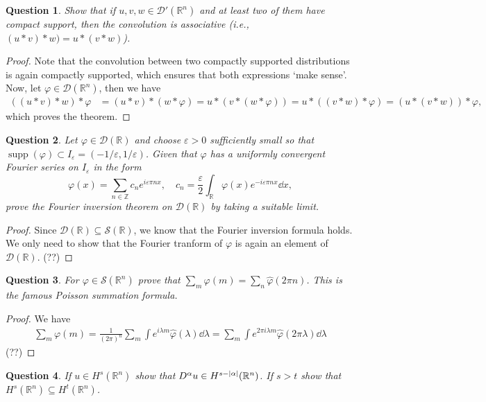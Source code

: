 \documentclass{article}
\theoremstyle{plain}
\newtheorem{question}{Question}
\theoremstyle{remark}
\renewcommand{\epsilon}{\varepsilon}
\renewcommand{\phi}{\varphi}
\newcommand{\Bb}{\mathbb}
\newcommand{\Cal}{\mathcal}
\newcommand\ZZ{\Bb Z}
\newcommand{\RR}{\Bb R}
\newcommand{\DD}{\Cal D}
\renewcommand\SS{\Cal S}
\newcommand\eps\epsilon
\DeclareMathOperator{\supp}{supp}
\begin{document}
\begin{question}
	Show that if $u, v, w \in \DD'(\RR^n)$ and at least two of them have compact support, then the convolution is associative (i.e., $(u * v) * w) = u* (v * w)$). 
\end{question}

\begin{proof}
	Note that the convolution between two compactly supported distributions is again compactly supported, which ensures that both expressions `make sense'. Now, let $\phi \in \DD(\RR^n)$, then we have
	\begin{align*}
		((u * v) * w) * \phi &= (u* v) * (w * \phi) = u * (v * ( w* \phi)) = u * ((v * w) * \phi) = (u * (v * w)) * \phi,
	\end{align*}
	which proves the theorem. 
\end{proof}

\begin{question}
	Let $\phi \in \DD(\RR)$ and choose $\eps > 0$ sufficiently small so that $\supp(\phi) \subset I_\eps = (-1/\eps, 1/\eps)$. Given that $\phi$ has a uniformly convergent Fourier series on $I_\eps$ in the form
	\[
	\phi(x) = \sum_{n \in \ZZ} c_n e^{i \eps \pi n x}, \quad c_n = \frac\eps2 \int_\RR \phi(x) e^{-i\eps \pi n x} \dd{x},
	\]
	prove the Fourier inversion theorem on $\DD(\RR)$ by taking a suitable limit. 
\end{question}

\begin{proof}
Since $\DD(\RR) \subseteq \SS(\RR)$, we know that the Fourier inversion formula holds. We only need to show that the Fourier tranform of $\phi$ is again an element of $\DD(\RR)$. (??)
\end{proof}

\begin{question}
	For $\phi \in \SS(\RR^n)$ prove that $\sum_m \phi(m) = \sum_n \hat\phi(2\pi n)$. This is the famous Poisson summation formula. 
\end{question}

\begin{proof}
	We have
	\begin{align*}
		\sum_m \phi(m) = \frac1{(2\pi)^n} \sum_m \int e^{i\lambda m} \hat \phi(\lambda) \dd{\lambda} = \sum_m \int e^{2\pi i \lambda m} \hat \phi(2\pi \lambda) \dd{\lambda}
	\end{align*}
(??)
\end{proof}

\begin{question}
	If $u \in H^s(\RR^n)$ show that $D^\alpha u\in H^{s - \abs{\alpha}} (\RR^n)$. If $s > t$ show that $H^s(\RR^n) \subseteq H^t(\RR^n)$. 
\end{question}
\end{document}
